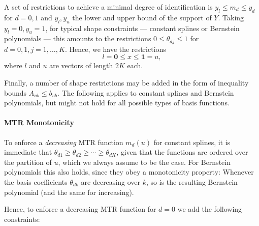 \documentclass[12pt,a4paper,english]{article} %
\numberwithin{equation}{section}
\theoremstyle{definition}
\theoremstyle{remark}
\theoremstyle{plain}
\begin{document}
A set of restrictions to achieve a minimal degree of identification is $y_l \leq m_d \leq y_d$ for $d=0,1$ and $y_l, y_u$ the lower and upper bound of the support of $Y$.
Taking $y_l = 0, y_u=1$, for typical shape constraints --- constant splines or Bernstein polynomials --- this amounts to the restrictions $0\leq \theta_{dj} \leq 1$ for $d=0,1, j=1,\ldots,K$.
Hence, we have the restrictions
\begin{equation*}
  l = \mathbf{0} \leq x \leq \mathbf{1} = u,
\end{equation*}
where $l$ and $u$ are vectors of length $2K$ each.

Finally, a number of shape restrictions may be added in the form of inequality bounds $A_{ub} \leq b_{ub}$.
The following applies to constant splines and Bernstein polynomials, but might not hold for all possible types of basis functions.

\paragraph{MTR Monotonicity}
To enforce a \textit{decreasing} MTR function $m_d(u)$ for constant splines, it is immediate that $\theta_{d1} \geq \theta_{d2} \geq \cdots \geq \theta_{dK}$, given that the functions are ordered over the partition of $u$, which we always assume to be the case.
For Bernstein polynomials this also holds, since they obey a monotonicity property: Whenever the basis coefficients $\theta_{dk}$ are decreasing over $k$, so is the resulting Bernstein polynomial (and the same for increasing).

Hence, to enforce a decreasing MTR function for $d=0$ we add the following constraints:
\end{document}
